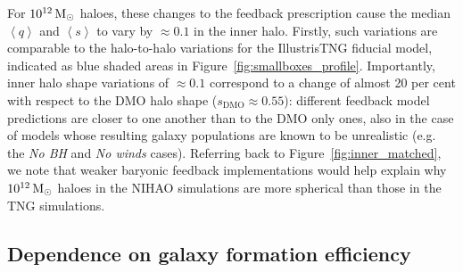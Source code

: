 \documentclass[fleqn,usenatbib]{mnras}
\def\msun{\,\rm M_{\odot}}
\begin{document}
For $10^{12} \msun$ haloes, these changes to the feedback prescription cause the median $\left<q\right>$ and $\left<s\right>$ to vary by ${\approx}0.1$ in the inner halo. Firstly, such variations are comparable to the halo-to-halo variations for the IllustrisTNG fiducial model, indicated as blue shaded areas in Figure~\ref{fig:smallboxes_profile}. Importantly, inner halo shape variations of ${\approx}0.1$ correspond to a change of almost 20 per cent with respect to the DMO halo shape ($s_\text{DMO} \approx 0.55$): different feedback model predictions are closer to one another than to the DMO only ones, also in the case of models whose resulting galaxy populations are known to be unrealistic (e.g. the \emph{No BH} and \emph{No winds} cases).
Referring back to Figure~\ref{fig:inner_matched}, we note that weaker baryonic feedback implementations would help explain why $10^{12} \msun$ haloes in the NIHAO simulations are more spherical than those in the TNG simulations.





\subsection{Dependence on galaxy formation efficiency}
\label{sec:correlation}
\end{document}
